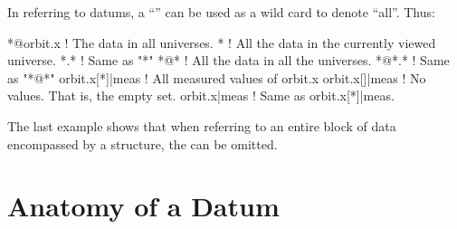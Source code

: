 In referring to datums, a ``\vn{*}'' can be used as a wild card to 
denote ``all''. Thus:
\begin{example}
  *@orbit.x       ! The  data in all universes.
  *               ! All the data in the currently viewed universe.
  *.*             ! Same as "*"
  *@*             ! All the data in all the universes. 
  *@*.*           ! Same as "*@*"
  orbit.x[*]|meas ! All measured values of orbit.x
  orbit.x[]|meas  ! No values. That is, the empty set.
  orbit.x|meas    ! Same as orbit.x[*]|meas.
\end{example}
The last example shows that when referring to an entire block of data
encompassed by a  structure, the \vn{[*]} can be omitted.

\section{Anatomy of a Datum}
\label{s:data.anatomy}

